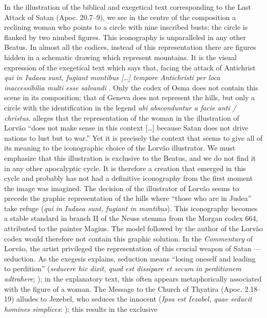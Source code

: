 \begin{paper}
In the illustration of the
biblical and exegetical text corresponding to the Last Attack of Satan
(Apoc. 20.7--9), we see in the centre of the composition a reclining
woman who points to a circle with nine inscribed busts; the circle is
flanked by two nimbed figures. This iconography is unparalleled in any
other Beatus. In almost all the codices, instead of this representation
there are figures hidden in a schematic drawing which represent
mountains. It is the visual expression of the exegetical text which says
that, facing the attack of Antichrist \emph{qui in Iudaea sunt, fugiant
montibus [\ldots] tempore Antichristi per loca inaccessibilia multi
esse salvandi} \citep[622]{gonzalez_echegaray_obras_1995}. Only the codex of
Osma does not contain this scene in its composition; that of Geneva does
not represent the hills, but only a circle with the identification in
the legend \emph{ubi absconduntur a facie anti / christus}. \citet[126]{klein_beato_2004} alleges that the representation of the woman in the illustration of
Lorvão ``does not make sense in this context [\ldots] because Satan
does not drive nations to lust but to war.'' Yet it is precisely the
context that seems to give all of its meaning to the iconographic choice
of the Lorvão illustrator. We must emphasize that this illustration is
exclusive to the Beatus, and we do not find it in any other apocalyptic
cycle. It is therefore a creation that emerged in this cycle and
probably has not had a definitive iconography from the first moment the
image was imagined. The decision of the illustrator of Lorvão seems to
precede the graphic representation of the hills where ``those who are in
Judea'' take refuge (\emph{qui in Iudaea sunt, fugiant in montibus}).
This iconography becomes a stable standard in branch II of the Neuss
stemma from the Morgan codex 664, attributed to the painter
Magius. The model followed by the author of the Lorvão codex would
therefore not contain this graphic solution. In the \emph{Commentary} of
Lorvão, the artist privileged the representation of this crucial weapon
of Satan –– seduction. As the exegesis explains, seduction means
``losing oneself and leading to perdition'' (\emph{seducere hic dixit,
quod est dissipare et secum in perditionem adtrahere}; \citealt[620]{gonzalez_echegaray_obras_1995}); in the explanatory text, this often appears
metaphorically associated with the figure of a woman. The Message to the
Church of Thyatira (Apoc. 2.18--19) alludes to Jezebel, who seduces the
innocent (\emph{Ipsa est Iezabel, quae seducit homines simplices}: \citealt[224]{gonzalez_echegaray_obras_1995}); this results in the exclusive

\end{paper}
